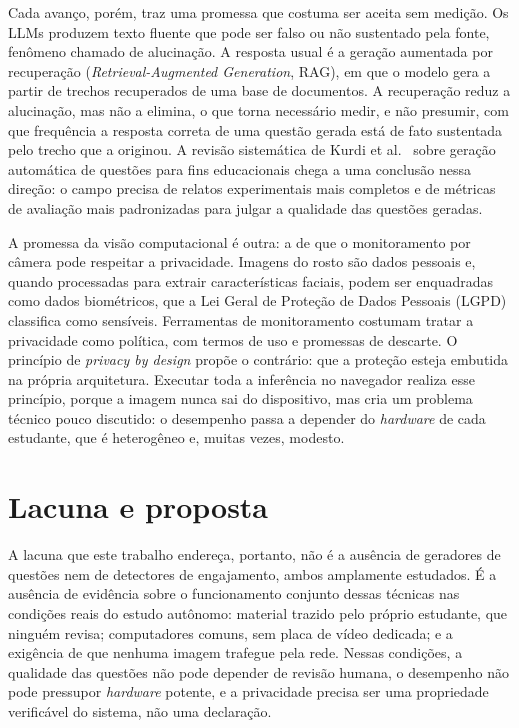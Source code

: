 \documentclass[portuguese,oneside]{tcc}
\newcommand{\estr}[1]{\emph{#1}}
\begin{document}
Cada avanço, porém, traz uma promessa que costuma ser aceita sem medição. Os LLMs produzem texto fluente que pode ser falso ou não sustentado pela fonte, fenômeno chamado de alucinação. A resposta usual é a geração aumentada por recuperação (\estr{Retrieval-Augmented Generation}, RAG), em que o modelo gera a partir de trechos recuperados de uma base de documentos. A recuperação reduz a alucinação, mas não a elimina, o que torna necessário medir, e não presumir, com que frequência a resposta correta de uma questão gerada está de fato sustentada pelo trecho que a originou. A revisão sistemática de Kurdi et al.\ \cite{Kur20} sobre geração automática de questões para fins educacionais chega a uma conclusão nessa direção: o campo precisa de relatos experimentais mais completos e de métricas de avaliação mais padronizadas para julgar a qualidade das questões geradas.

A promessa da visão computacional é outra: a de que o monitoramento por câmera pode respeitar a privacidade. Imagens do rosto são dados pessoais e, quando processadas para extrair características faciais, podem ser enquadradas como dados biométricos, que a Lei Geral de Proteção de Dados Pessoais (LGPD) classifica como sensíveis. Ferramentas de monitoramento costumam tratar a privacidade como política, com termos de uso e promessas de descarte. O princípio de \estr{privacy by design} propõe o contrário: que a proteção esteja embutida na própria arquitetura. Executar toda a inferência no navegador realiza esse princípio, porque a imagem nunca sai do dispositivo, mas cria um problema técnico pouco discutido: o desempenho passa a depender do \estr{hardware} de cada estudante, que é heterogêneo e, muitas vezes, modesto.

\section{Lacuna e proposta}

A lacuna que este trabalho endereça, portanto, não é a ausência de geradores de questões nem de detectores de engajamento, ambos amplamente estudados. É a ausência de evidência sobre o funcionamento conjunto dessas técnicas nas condições reais do estudo autônomo: material trazido pelo próprio estudante, que ninguém revisa; computadores comuns, sem placa de vídeo dedicada; e a exigência de que nenhuma imagem trafegue pela rede. Nessas condições, a qualidade das questões não pode depender de revisão humana, o desempenho não pode pressupor \estr{hardware} potente, e a privacidade precisa ser uma propriedade verificável do sistema, não uma declaração.
\end{document}
